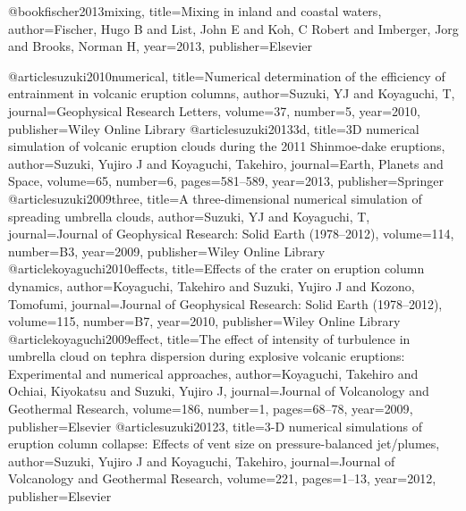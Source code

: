@book{fischer2013mixing,
  title={Mixing in inland and coastal waters},
  author={Fischer, Hugo B and List, John E and Koh, C Robert and Imberger, Jorg and Brooks, Norman H},
  year={2013},
  publisher={Elsevier}
}

@article{suzuki2010numerical,
  title={Numerical determination of the efficiency of entrainment in volcanic eruption columns},
  author={Suzuki, YJ and Koyaguchi, T},
  journal={Geophysical Research Letters},
  volume={37},
  number={5},
  year={2010},
  publisher={Wiley Online Library}
}
@article{suzuki20133d,
  title={3D numerical simulation of volcanic eruption clouds during the 2011 Shinmoe-dake eruptions},
  author={Suzuki, Yujiro J and Koyaguchi, Takehiro},
  journal={Earth, Planets and Space},
  volume={65},
  number={6},
  pages={581--589},
  year={2013},
  publisher={Springer}
}
@article{suzuki2009three,
  title={A three-dimensional numerical simulation of spreading umbrella clouds},
  author={Suzuki, YJ and Koyaguchi, T},
  journal={Journal of Geophysical Research: Solid Earth (1978--2012)},
  volume={114},
  number={B3},
  year={2009},
  publisher={Wiley Online Library}
}
@article{koyaguchi2010effects,
  title={Effects of the crater on eruption column dynamics},
  author={Koyaguchi, Takehiro and Suzuki, Yujiro J and Kozono, Tomofumi},
  journal={Journal of Geophysical Research: Solid Earth (1978--2012)},
  volume={115},
  number={B7},
  year={2010},
  publisher={Wiley Online Library}
}
@article{koyaguchi2009effect,
  title={The effect of intensity of turbulence in umbrella cloud on tephra dispersion during explosive volcanic eruptions: Experimental and numerical approaches},
  author={Koyaguchi, Takehiro and Ochiai, Kiyokatsu and Suzuki, Yujiro J},
  journal={Journal of Volcanology and Geothermal Research},
  volume={186},
  number={1},
  pages={68--78},
  year={2009},
  publisher={Elsevier}
}
@article{suzuki20123,
  title={3-D numerical simulations of eruption column collapse: Effects of vent size on pressure-balanced jet/plumes},
  author={Suzuki, Yujiro J and Koyaguchi, Takehiro},
  journal={Journal of Volcanology and Geothermal Research},
  volume={221},
  pages={1--13},
  year={2012},
  publisher={Elsevier}
}

